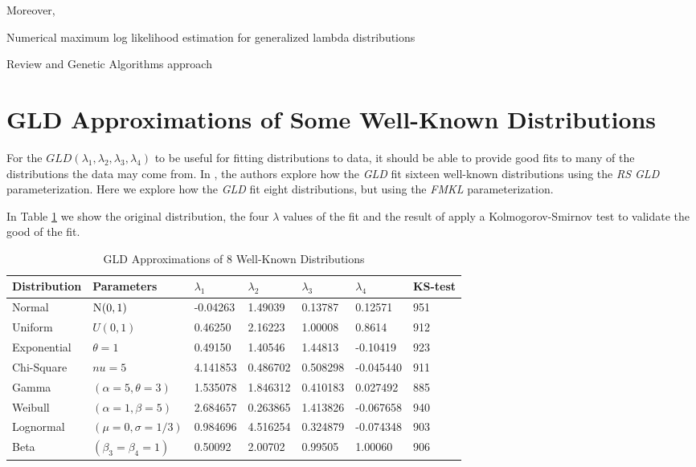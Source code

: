 Moreover, \cite{Lampasi2006}

Numerical maximum log likelihood estimation for generalized lambda distributions 

\cite{Lodziensis2013}
\cite{Lakhany2000}
\cite{Fournier2007}
\cite{Marcondes2018}
Review and Genetic Algorithms approach \cite{Corlu2016}

\section{GLD Approximations of Some Well-Known Distributions}\label{sec:gld_fit_other}
For the $GLD(\lambda_{1}, \lambda_{2}, \lambda_{3}, \lambda_{4})$ to be useful for fitting distributions to data, it should be able to provide good fits to many of the distributions the data may come from. In \cite{Karian2011}, the authors explore how the \textit{GLD} fit sixteen well-known distributions using the \textit{RS GLD} parameterization. Here we explore how the \textit{GLD} fit eight distributions, but using the \textit{FMKL} parameterization.

In Table \ref{tab:gld_fit_other} we show the original distribution, the four $\lambda$ values of the fit and the result of apply a Kolmogorov-Smirnov test to validate the good of the fit.

\begin{table}[H]
\centering
\caption{GLD Approximations of 8 Well-Known Distributions}
\label{tab:gld_fit_other}
\begin{tabular}{l|l|l|l|l|l|l}
\hline
Distribution & Parameters                    & $\lambda_{1}$ & $\lambda_{2}$ & $\lambda_{3}$ & $\lambda_{4}$ & KS-test \\ \hline
Normal       & $\textsc{N}(0, 1)$                     & -0.04263   & 1.49039    & 0.13787    & 0.12571    & 951     \\ \hline
Uniform      & $U(0, 1)$                     & 0.46250     & 2.16223     & 1.00008     & 0.8614     & 912     \\ \hline
Exponential  & $\theta = 1$                  & 0.49150     & 1.40546     & 1.44813     & -0.10419    & 923     \\ \hline
Chi-Square   & $nu = 5$                      & 4.141853    & 0.486702    & 0.508298    & -0.045440   & 911     \\ \hline
Gamma        & $(\alpha = 5, \theta = 3)$    & 1.535078    & 1.846312    & 0.410183    & 0.027492    & 885     \\ \hline
Weibull      & $(\alpha = 1, \beta = 5)$     & 2.684657    & 0.263865    & 1.413826    & -0.067658   & 940     \\ \hline
Lognormal    & $(\mu = 0, \sigma = 1/3)$     & 0.984696    & 4.516254    & 0.324879    & -0.074348   & 903     \\ \hline
Beta         & $(\beta_{3} = \beta_{4} = 1)$ & 0.50092     & 2.00702     & 0.99505     & 1.00060     & 906     \\ \hline
\end{tabular}
\end{table}

